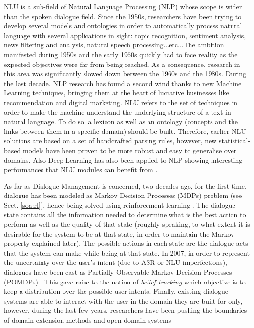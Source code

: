 		NLU is a sub-field of Natural Language Processing (NLP) whose scope is wider than the spoken dialogue field. Since the 1950s, researchers have been trying to develop several models and ontologies in order to automatically process natural language with several applications in sight: topic recognition, sentiment analysis, news filtering and analysis, natural speech processing...etc...The ambition manifested during 1950s and the early 1960s quickly had to face reality as the expected objectives were far from being reached. As a consequence, research in this area was significantly slowed down between the 1960s and the 1980s. During the last decade, NLP research has found a second wind thanks to new Machine Learning techniques, bringing them at the heart of lucrative businesses like recommendation and digital marketing. NLU refers to the set of techniques in order to make the machine understand the underlying structure of a text in natural language. To do so, a lexicon as well as an ontology (concepts and the links between them in a specific domain) should be built. Therefore, earlier NLU solutions are based on a set of handcrafted parsing rules, however, new statistical-based models \cite{Macherey2009} have been proven to be more robust and easy to generalise over domains. Also Deep Learning has also been applied to NLP showing interesting performances that NLU modules can benefit from \cite{Bengio2003,Collobert2011}.

		As far as Dialogue Management is concerned, two decades ago, for the first time, dialogue has been modeled as Markov Decision Processes (MDPs) problem (see Sect. \ref{soa:rl}), hence being solved using reinforcement learning \cite{Levin1997a}. The dialogue state contains all the information needed to determine what is the best action to perform as well as the quality of that state (roughly speaking, to what extent it is desirable for the system to be at that state, in order to maintain the Markov property explained later). The possible actions in each state are the dialogue acts that the system can make while being at that state. In 2007, in order to represent the uncertainty over the user's intent (due to ASR or NLU imperfections), dialogues have been cast as Partially Observable Markov Decision Processes (POMDPs) \cite{Williams2007}. This gave raise to the notion of \textit{belief tracking} which objective is to keep a distribution over the possible user intents. Finally, existing dialogue systems are able to interact with the user in the domain they are built for only, however, during the last few years, researchers have been pushing the boundaries of domain  extension methods \cite{Gasic2013} and open-domain systems \cite{Pakucs2003,EkeinhorKomi2014,Wang2014}
		
